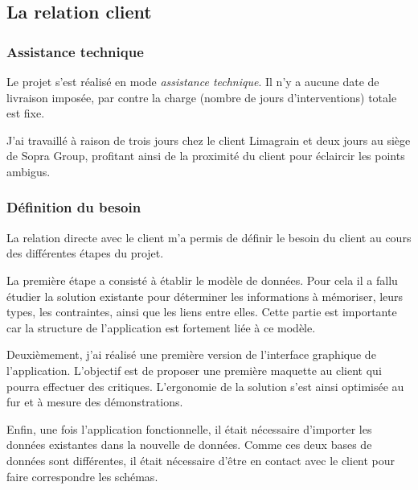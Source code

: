 \subsection{La relation client}


\subsubsection{Assistance technique}


Le projet s'est réalisé en mode \textit{assistance technique}.
Il n'y a aucune date de livraison imposée, par contre la charge (nombre de jours d'interventions) totale est fixe.

J'ai travaillé à raison de trois jours chez le client Limagrain et deux jours au siège de Sopra Group, profitant ainsi de la proximité du client pour éclaircir les points ambigus.


\subsubsection{Définition du besoin}

La relation directe avec le client m'a permis de définir le besoin du client au cours des différentes étapes du projet.

La première étape a consisté à établir le modèle de données.
Pour cela il a fallu étudier la solution existante pour déterminer les informations à mémoriser, leurs types, les contraintes, ainsi que les liens entre elles.
Cette partie est importante car la structure de l'application est fortement liée à ce modèle.

Deuxièmement, j'ai réalisé une première version de l'interface graphique de l'application.
L'objectif est de proposer une première maquette au client qui pourra effectuer des critiques.
L'ergonomie de la solution s'est ainsi optimisée au fur et à mesure des démonstrations.

Enfin, une fois l'application fonctionnelle, il était nécessaire d'importer les données existantes dans la nouvelle de données.
Comme ces deux bases de données sont différentes, il était nécessaire d'être en contact avec le client pour faire correspondre les schémas.

